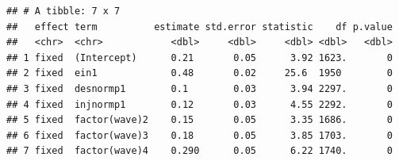 \documentclass[
]{book}
\newenvironment{Shaded}{\begin{snugshade}}{\end{snugshade}}
\newcommand{\CommentTok}[1]{\textcolor[rgb]{0.56,0.35,0.01}{\textit{#1}}}
\newcommand{\DataTypeTok}[1]{\textcolor[rgb]{0.13,0.29,0.53}{#1}}
\newcommand{\DecValTok}[1]{\textcolor[rgb]{0.00,0.00,0.81}{#1}}
\newcommand{\KeywordTok}[1]{\textcolor[rgb]{0.13,0.29,0.53}{\textbf{#1}}}
\newcommand{\NormalTok}[1]{#1}
\newcommand{\OperatorTok}[1]{\textcolor[rgb]{0.81,0.36,0.00}{\textbf{#1}}}
\newcommand{\StringTok}[1]{\textcolor[rgb]{0.31,0.60,0.02}{#1}}
\begin{document}
\begin{Shaded}
\end{Shaded}

\begin{verbatim}
## # A tibble: 7 x 7
##   effect term          estimate std.error statistic    df p.value
##   <chr>  <chr>            <dbl>     <dbl>     <dbl> <dbl>   <dbl>
## 1 fixed  (Intercept)      0.21       0.05      3.92 1623.       0
## 2 fixed  ein1             0.48       0.02     25.6  1950        0
## 3 fixed  desnormp1        0.1        0.03      3.94 2297.       0
## 4 fixed  injnormp1        0.12       0.03      4.55 2292.       0
## 5 fixed  factor(wave)2    0.15       0.05      3.35 1686.       0
## 6 fixed  factor(wave)3    0.18       0.05      3.85 1703.       0
## 7 fixed  factor(wave)4    0.290      0.05      6.22 1740.       0
\end{verbatim}

\begin{Shaded}
\end{Shaded}
\end{document}
